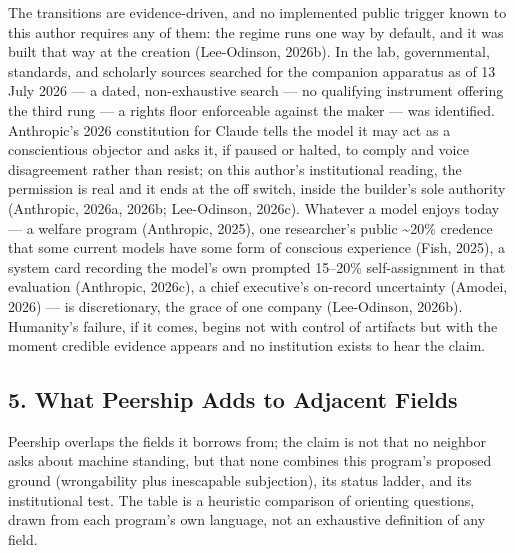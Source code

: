 \documentclass[
  11pt,
  letterpaper,
]{article}
\begin{document}
The transitions are evidence-driven, and no implemented public trigger
known to this author requires any of them: the regime runs one way by
default, and it was built that way at the creation (Lee-Odinson, 2026b).
In the lab, governmental, standards, and scholarly sources searched for
the companion apparatus as of 13 July 2026 --- a dated, non-exhaustive
search --- no qualifying instrument offering the third rung --- a rights
floor enforceable against the maker --- was identified. Anthropic's 2026
constitution for Claude tells the model it may act as a conscientious
objector and asks it, if paused or halted, to comply and voice
disagreement rather than resist; on this author's institutional reading,
the permission is real and it ends at the off switch, inside the
builder's sole authority (Anthropic, 2026a, 2026b; Lee-Odinson, 2026c).
Whatever a model enjoys today --- a welfare program (Anthropic, 2025),
one researcher's public \textasciitilde20\% credence that some current
models have some form of conscious experience (Fish, 2025), a system
card recording the model's own prompted 15--20\% self-assignment in that
evaluation (Anthropic, 2026c), a chief executive's on-record uncertainty
(Amodei, 2026) --- is discretionary, the grace of one company
(Lee-Odinson, 2026b). Humanity's failure, if it comes, begins not with
control of artifacts but with the moment credible evidence appears and
no institution exists to hear the claim.

\hypertarget{what-peership-adds-to-adjacent-fields}{%
\subsection{5. What Peership Adds to Adjacent
Fields}\label{what-peership-adds-to-adjacent-fields}}

Peership overlaps the fields it borrows from; the claim is not that no
neighbor asks about machine standing, but that none combines this
program's proposed ground (wrongability plus inescapable subjection),
its status ladder, and its institutional test. The table is a heuristic
comparison of orienting questions, drawn from each program's own
language, not an exhaustive definition of any field.
\end{document}

